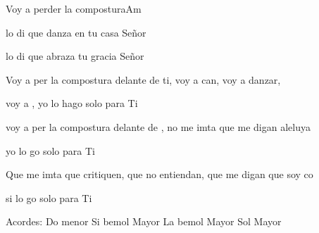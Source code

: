 \documentclass[12pt, spanish]{book}
\begin{document}
\begin{song}{Voy a perder la compostura}{Am}
\begin{SBExtraKeys}
{            


            \begin{SBOpGroup}
                 lo di que  danza en tu casa Señor


                 lo di que  abraza tu gracia Señor
            \end{SBOpGroup}

            \begin{SBChorus}
                Voy a per la compostura delante de ti, voy a can, voy a danzar,

                voy a , yo lo hago solo para Ti

                voy a per la compostura delante de , no me imta que me digan aleluya

                yo lo go solo para Ti
            \end{SBChorus}

            \begin{SBOpGroup}
                Que me imta que critiquen, que no entiendan, que me digan que soy co

                si  lo go solo para Ti
            \end{SBOpGroup}

            \ifChordBk
            \begin{SBOpGroup}
                Acordes:\break
                \upchord{\Cm}Do menor \hfill
                \upchord{\Bflat}\qquad Si bemol Mayor \hfill\null\break
                \upchord{\Aflat}\qquad La bemol Mayor \hfill
                \upchord{\G}\qquad Sol Mayor \hfill\null\break
            \end{SBOpGroup}
            \fi
        }\end{SBExtraKeys}
    \end{song}
\end{document}
